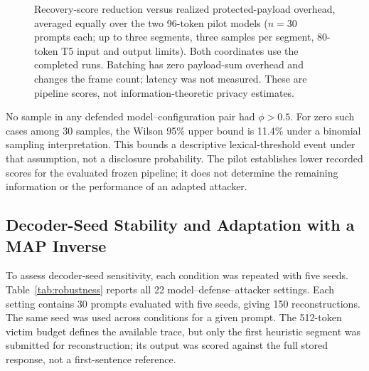 \documentclass[electronics,article,submit,pdftex,moreauthors]{Definitions/mdpi}
\begin{document}
\begin{figure}[ht]
\centering
{}
\caption{Recovery-score reduction versus realized protected-payload overhead, averaged equally over the two 96-token pilot models ($n=30$ prompts each; up to three segments, three samples per segment, 80-token T5 input and output limits). Both coordinates use the completed runs. Batching has zero payload-sum overhead and changes the frame count; latency was not measured. These are pipeline scores, not information-theoretic privacy estimates.}
\label{fig:defense_tradeoff}
\end{figure}

No sample in any defended model--configuration pair had $\phi>0.5$. For zero such cases among 30 samples, the Wilson 95\% upper bound is 11.4\% under a binomial sampling interpretation. This bounds a descriptive lexical-threshold event under that assumption, not a disclosure probability. The pilot establishes lower recorded scores for the evaluated frozen pipeline; it does not determine the remaining information or the performance of an adapted attacker.

\subsection{Decoder-Seed Stability and Adaptation with a MAP Inverse}\label{sec:robustness}
To assess decoder-seed sensitivity, each condition was repeated with five seeds. Table~\ref{tab:robustness} reports all 22 model--defense--attacker settings. Each setting contains 30 prompts evaluated with five seeds, giving 150 reconstructions. The same seed was used across conditions for a given prompt. The 512-token victim budget defines the available trace, but only the first heuristic segment was submitted for reconstruction; its output was scored against the full stored response, not a first-sentence reference.
\end{document}
